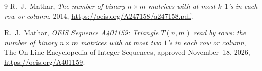 \documentclass[11pt]{article}
\begin{document}
\begin{thebibliography}{9}
R.~J.~Mathar, \emph{The number of binary $n \times m$ matrices with at most $k$ $1$'s in each row or column}, 2014, \url{https://oeis.org/A247158/a247158.pdf}.

R.~J.~Mathar, \emph{OEIS Sequence A401159: Triangle $T(n,m)$ read by rows: the number of binary $n \times m$ matrices with at most two $1$'s in each row or column}, The On-Line Encyclopedia of Integer Sequences, approved November~18, 2026, \url{https://oeis.org/A401159}.
\end{thebibliography}
\end{document}
